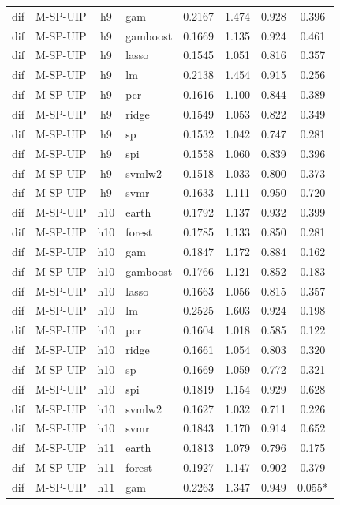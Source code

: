 \begin{ThreePartTable}
\begin{longtable}[t]{llclcccc}
dif & M-SP-UIP & h9 & gam & 0.2167 & 1.474 & 0.928 & 0.396\\
dif & M-SP-UIP & h9 & gamboost & 0.1669 & 1.135 & 0.924 & 0.461\\
dif & M-SP-UIP & h9 & lasso & 0.1545 & 1.051 & 0.816 & 0.357\\
dif & M-SP-UIP & h9 & lm & 0.2138 & 1.454 & 0.915 & 0.256\\
dif & M-SP-UIP & h9 & pcr & 0.1616 & 1.100 & 0.844 & 0.389\\
dif & M-SP-UIP & h9 & ridge & 0.1549 & 1.053 & 0.822 & 0.349\\
dif & M-SP-UIP & h9 & sp & 0.1532 & 1.042 & 0.747 & 0.281\\
dif & M-SP-UIP & h9 & spi & 0.1558 & 1.060 & 0.839 & 0.396\\
dif & M-SP-UIP & h9 & svmlw2 & 0.1518 & 1.033 & 0.800 & 0.373\\
dif & M-SP-UIP & h9 & svmr & 0.1633 & 1.111 & 0.950 & 0.720\\
\addlinespace
dif & M-SP-UIP & h10 & earth & 0.1792 & 1.137 & 0.932 & 0.399\\
dif & M-SP-UIP & h10 & forest & 0.1785 & 1.133 & 0.850 & 0.281\\
dif & M-SP-UIP & h10 & gam & 0.1847 & 1.172 & 0.884 & 0.162\\
dif & M-SP-UIP & h10 & gamboost & 0.1766 & 1.121 & 0.852 & 0.183\\
dif & M-SP-UIP & h10 & lasso & 0.1663 & 1.056 & 0.815 & 0.357\\
dif & M-SP-UIP & h10 & lm & 0.2525 & 1.603 & 0.924 & 0.198\\
dif & M-SP-UIP & h10 & pcr & 0.1604 & 1.018 & 0.585 & 0.122\\
dif & M-SP-UIP & h10 & ridge & 0.1661 & 1.054 & 0.803 & 0.320\\
dif & M-SP-UIP & h10 & sp & 0.1669 & 1.059 & 0.772 & 0.321\\
dif & M-SP-UIP & h10 & spi & 0.1819 & 1.154 & 0.929 & 0.628\\
dif & M-SP-UIP & h10 & svmlw2 & 0.1627 & 1.032 & 0.711 & 0.226\\
dif & M-SP-UIP & h10 & svmr & 0.1843 & 1.170 & 0.914 & 0.652\\
\addlinespace
dif & M-SP-UIP & h11 & earth & 0.1813 & 1.079 & 0.796 & 0.175\\
dif & M-SP-UIP & h11 & forest & 0.1927 & 1.147 & 0.902 & 0.379\\
dif & M-SP-UIP & h11 & gam & 0.2263 & 1.347 & 0.949 & 0.055*\\

\end{longtable}
\end{ThreePartTable}
